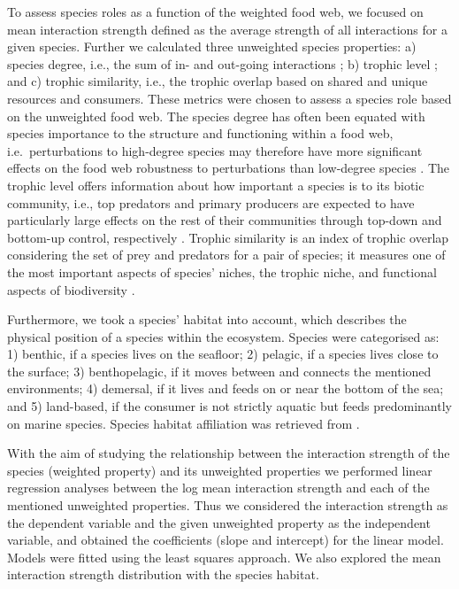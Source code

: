 \documentclass[gc, manuscript]{copernicus}
\begin{document}
To assess species roles as a function of the weighted food web, we
focused on mean interaction strength defined as the average strength of
all interactions for a given species. Further we calculated three
unweighted species properties: a) species degree, i.e., the sum of in-
and out-going interactions ; b) trophic level ; and c) trophic
similarity, i.e., the trophic overlap based on shared and unique
resources and consumers. These metrics were chosen to assess a species
role based on the unweighted food web. The species degree has often been
equated with species importance to the structure and functioning within
a food web, i.e.~perturbations to high-degree species may therefore have
more significant effects on the food web robustness to perturbations
than low-degree species
\citetext{\citealp{Dunne2002a}; \citealp[references
in][]{Cirtwill2018a}}. The trophic level offers information about how
important a species is to its biotic community, i.e., top predators and
primary producers are expected to have particularly large effects on the
rest of their communities through top-down and bottom-up control,
respectively \citep[references in][]{Cirtwill2018a}. Trophic similarity
is an index of trophic overlap considering the set of prey and predators
for a pair of species; it measures one of the most important aspects of
species' niches, the trophic niche, and functional aspects of
biodiversity \citep{Martinez1991, Williams2000}.

Furthermore, we took a species' habitat into account, which describes
the physical position of a species within the ecosystem. Species were
categorised as: 1) benthic, if a species lives on the seafloor; 2)
pelagic, if a species lives close to the surface; 3) benthopelagic, if
it moves between and connects the mentioned environments; 4) demersal,
if it lives and feeds on or near the bottom of the sea; and 5)
land-based, if the consumer is not strictly aquatic but feeds
predominantly on marine species. Species habitat affiliation was
retrieved from \citet{Jacob2011}.

With the aim of studying the relationship between the interaction
strength of the species (weighted property) and its unweighted
properties we performed linear regression analyses between the log mean
interaction strength and each of the mentioned unweighted properties.
Thus we considered the interaction strength as the dependent variable
and the given unweighted property as the independent variable, and
obtained the coefficients (slope and intercept) for the linear model.
Models were fitted using the least squares approach. We also explored
the mean interaction strength distribution with the species habitat.
\end{document}

